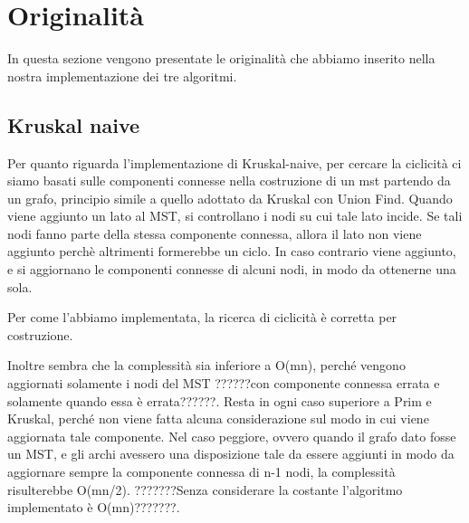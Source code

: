 \chapter{Originalità\label{sec:originalita}}
\noindent In questa sezione vengono presentate le originalità che abbiamo inserito nella nostra implementazione dei tre algoritmi.

\section{Kruskal naive\label{sec:originalitanaives}}

Per quanto riguarda l'implementazione di Kruskal-naive, per cercare la ciclicità ci siamo basati sulle componenti connesse nella costruzione di un mst partendo da un grafo, principio simile a quello adottato da Kruskal con Union Find.
Quando viene aggiunto un lato al MST, si controllano i nodi su cui tale lato incide.
Se tali nodi fanno parte della stessa componente connessa, allora il lato non viene aggiunto perchè altrimenti formerebbe un ciclo.
In caso contrario viene aggiunto, e si aggiornano le componenti connesse di alcuni nodi, in modo da ottenerne una sola.

Per come l'abbiamo implementata, la ricerca di ciclicità è corretta per costruzione.

Inoltre sembra che la complessità sia inferiore a O(mn), perché vengono aggiornati solamente i nodi del MST ??????con componente connessa errata e solamente quando essa è errata??????.
Resta in ogni caso superiore a Prim e Kruskal, perché non viene fatta alcuna considerazione sul modo in cui viene aggiornata tale componente.
Nel caso peggiore, ovvero quando il grafo dato fosse un MST, e gli archi avessero una disposizione tale da essere aggiunti in modo da aggiornare sempre la componente connessa di n-1 nodi, la complessità risulterebbe O(mn/2).
???????Senza considerare la costante l'algoritmo implementato è O(mn)???????.
